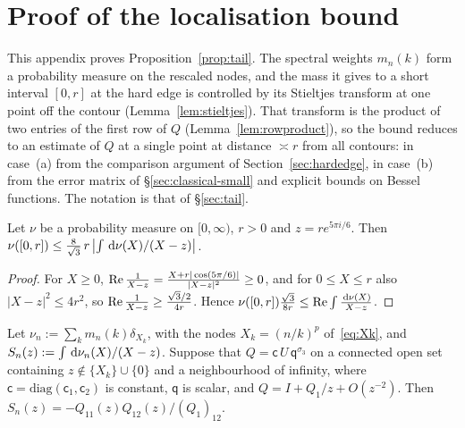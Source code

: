 
\section{Proof of the localisation bound}\label{app:tail}

This appendix proves Proposition~\ref{prop:tail}. The spectral weights $m_n(k)$ form a probability measure on the
rescaled nodes, and the mass it gives to a short interval $[0,r]$ at the hard edge is controlled by its Stieltjes
transform at one point off the contour (Lemma~\ref{lem:stieltjes}). That transform is the product of two entries of the first row of
$Q$ (Lemma~\ref{lem:rowproduct}), so the bound reduces to an estimate of $Q$ at a single point at distance $\asymp r$
from all contours: in case~(a) from the comparison argument of Section~\ref{sec:hardedge}, in case~(b) from the error
matrix of \S\ref{sec:classical-small} and explicit bounds on Bessel functions. The notation is that of
\S\ref{sec:tail}.

\begin{lemma}\label{lem:stieltjes}
Let $\nu$ be a probability measure on $[0,\infty)$, $r>0$ and $z=re^{5\pi i/6}$. Then
$\nu([0,r])\le\frac8{\sqrt3}\,r\,\bigl|\int\,\mathrm{d}\nu(X)/(X-z)\bigr|$.
\end{lemma}

\begin{proof}
For $X\ge0$, $\operatorname{Re}\frac1{X-z}=\frac{X+r|\cos(5\pi/6)|}{|X-z|^2}\ge0$, and for $0\le X\le r$ also $|X-z|^2\le4r^2$, so
$\operatorname{Re}\frac1{X-z}\ge\frac{\sqrt3/2}{4r}$. Hence $\nu([0,r])\frac{\sqrt3}{8r}\le\operatorname{Re}\int\frac{\,\mathrm{d}\nu(X)}{X-z}$.
\end{proof}

\begin{lemma}\label{lem:rowproduct}
Let $\nu_n:=\sum_km_n(k)\delta_{X_k}$, with the nodes $X_k=(n/k)^p$ of~\eqref{eq:Xk}, and $S_n(z):=\int\,\mathrm{d}\nu_n(X)/(X-z)$.
Suppose that $Q=\mathsf c\,U\,\mathsf q^{\sigma_3}$ on a connected open set containing $z\notin\{X_k\}\cup\{0\}$ and a
neighbourhood of infinity, where $\mathsf c=\mathrm{diag}(\mathsf c_1,\mathsf c_2)$ is constant, $\mathsf q$ is scalar, and
$Q=I+Q_1/z+O(z^{-2})$. Then $S_n(z)=-Q_{11}(z)Q_{12}(z)/(Q_1)_{12}$.
\end{lemma}

